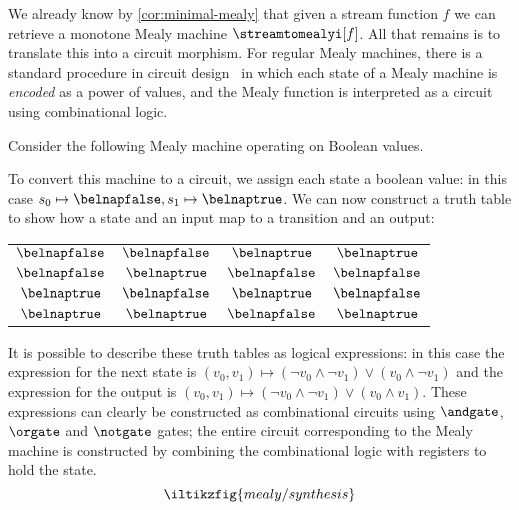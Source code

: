We already know by \cref{cor:minimal-mealy} that given a stream function
\(f\) we can retrieve a monotone Mealy machine \(\streamtomealyi[f]\).
All that remains is to translate this into a circuit morphism.
For regular Mealy machines, there is a standard procedure in circuit
design~\cite{kohavi2009switching} in which each state of a Mealy machine is
\emph{encoded} as a power of values, and the Mealy function is interpreted as
a circuit using combinational logic.

\begin{example}\label{ex:boolean-to-circuit}
    Consider the following Mealy machine operating on Boolean values.
    \begin{center}
        
    \end{center}
    \vspace{-\belowdisplayskip}
    To convert this machine to a circuit, we assign each state a boolean value:
    in this case \(s_0 \mapsto \belnapfalse, s_1 \mapsto \belnaptrue\).
    We can now construct a truth table to show how a state and an input map to
    a transition and an output:
    \begin{center}
        \begin{tabular}{cc|cc}
            \(\belnapfalse\) & \(\belnapfalse\) & \(\belnaptrue\)  & \(\belnaptrue\)  \\
            \(\belnapfalse\) & \(\belnaptrue\)  & \(\belnapfalse\) & \(\belnapfalse\) \\
            \(\belnaptrue\)  & \(\belnapfalse\) & \(\belnaptrue\)  & \(\belnapfalse\) \\
            \(\belnaptrue\)  & \(\belnaptrue\)  & \(\belnapfalse\) & \(\belnaptrue\)  \\
        \end{tabular}
    \end{center}
    It is possible to describe these truth tables as logical expressions: in
    this case the expression for the next state is \(
    (v_0, v_1)
    \mapsto
    (\neg v_0 \land \neg v_1) \lor (v_0 \land \neg v_1)
    \) and the expression for the output is \(
    (v_0, v_1)
    \mapsto
    (\neg v_0 \land \neg v_1) \lor (v_0 \land v_1)
    \).
    These expressions can clearly be constructed as combinational circuits using
    \(\andgate\), \(\orgate\) and \(\notgate\) gates; the entire circuit
    corresponding to the Mealy machine is constructed by combining the
    combinational logic with registers to hold the state.
    \[\iltikzfig{mealy/synthesis}\]
\end{example}

